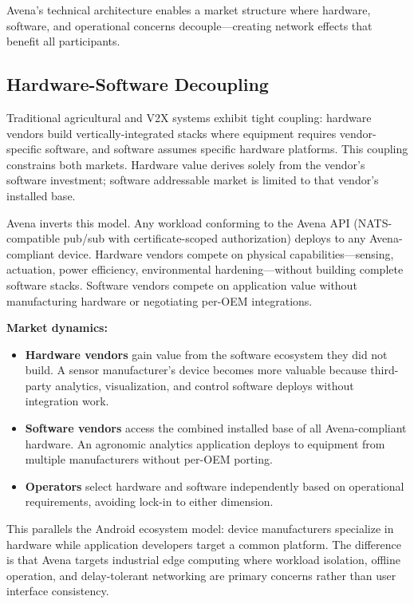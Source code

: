 Avena's technical architecture enables a market structure where hardware, software, and operational concerns decouple---creating network effects that benefit all participants.

\subsection{Hardware-Software Decoupling}

Traditional agricultural and V2X systems exhibit tight coupling: hardware vendors build vertically-integrated stacks where equipment requires vendor-specific software, and software assumes specific hardware platforms. This coupling constrains both markets. Hardware value derives solely from the vendor's software investment; software addressable market is limited to that vendor's installed base.

Avena inverts this model. Any workload conforming to the Avena API (NATS-compatible pub/sub with certificate-scoped authorization) deploys to any Avena-compliant device. Hardware vendors compete on physical capabilities---sensing, actuation, power efficiency, environmental hardening---without building complete software stacks. Software vendors compete on application value without manufacturing hardware or negotiating per-OEM integrations.

\textbf{Market dynamics:}
\begin{itemize}[nosep]
    \item \textbf{Hardware vendors} gain value from the software ecosystem they did not build. A sensor manufacturer's device becomes more valuable because third-party analytics, visualization, and control software deploys without integration work.
    \item \textbf{Software vendors} access the combined installed base of all Avena-compliant hardware. An agronomic analytics application deploys to equipment from multiple manufacturers without per-OEM porting.
    \item \textbf{Operators} select hardware and software independently based on operational requirements, avoiding lock-in to either dimension.
\end{itemize}

This parallels the Android ecosystem model: device manufacturers specialize in hardware while application developers target a common platform. The difference is that Avena targets industrial edge computing where workload isolation, offline operation, and delay-tolerant networking are primary concerns rather than user interface consistency.

